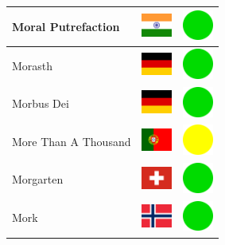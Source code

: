 \documentclass[12pt, a4paper, twoside]{report}
\begin{document}
\begin{center}
\begin{longtable}{|p{5cm}|p{2cm}|p{2cm}|}
 Moral Putrefaction                                         & \includegraphics[width=1cm]{../img/flags/in} &   \includegraphics[width=1cm]{../likes/y} \\ \hline
 Morasth                                                    & \includegraphics[width=1cm]{../img/flags/de} &   \includegraphics[width=1cm]{../likes/y} \\ \hline
 Morbus Dei                                                 & \includegraphics[width=1cm]{../img/flags/de} &   \includegraphics[width=1cm]{../likes/y} \\ \hline
 More Than A Thousand                                       & \includegraphics[width=1cm]{../img/flags/pt} &   \includegraphics[width=1cm]{../likes/m} \\ \hline
 Morgarten                                                  & \includegraphics[width=1cm]{../img/flags/ch} &   \includegraphics[width=1cm]{../likes/y} \\ \hline
 Mork                                                       & \includegraphics[width=1cm]{../img/flags/no} &   \includegraphics[width=1cm]{../likes/y} \\ \hline

\end{longtable}
\end{center}
\end{document}
